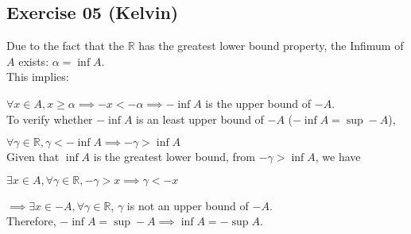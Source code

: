 \subsection*{Exercise 05 (Kelvin)}
Due to the fact that the $\mathbb{R}$ has the greatest lower bound property, the Infimum of $A$ exists: $ \alpha = \inf A $.\\
This implies:

$\forall x \in A, x \ge \alpha \implies -x<-\alpha \implies -\inf A$ is the upper bound of $-A$.\\
To verify whether $-\inf A$ is an least upper bound of $-A$ ($-\inf A = \sup -A$),

$\forall \gamma \in \mathbb{R}, \gamma < -\inf A \implies -\gamma > \inf A$ \\
Given that $\inf A$ is the greatest lower bound, from $-\gamma > \inf A$, we have

$\exists x \in A, \forall \gamma \in \mathbb{R}, -\gamma > x \implies \gamma < -x $

$\implies \exists x \in -A, \forall \gamma \in \mathbb{R}$, $\gamma$ is not an upper bound of $-A$. \\
Therefore, $-\inf A = \sup -A \implies \inf A = -\sup A$.

